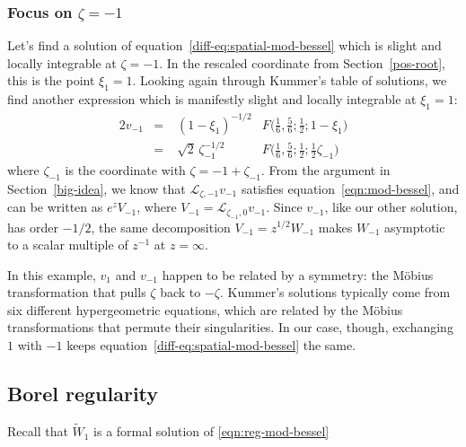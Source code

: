 \documentclass{article}
\newcommand{\laplace}{\mathcal{L}}
\begin{document}
\subsubsection{Focus on $\zeta = -1$}\label{neg-root}
Let's find a solution of equation~\eqref{diff-eq:spatial-mod-bessel} which is slight and locally integrable at $\zeta = -1$. In the rescaled coordinate from Section~\ref{pos-root}, this is the point $\xi_1 = 1$. Looking again through Kummer's table of solutions, we find another expression \cite[formula~15.10.14]{dlmf} which is manifestly slight and locally integrable at $\xi_1 = 1$:
\begin{alignat*}{2}
v_{-1} &=\;& (1-\xi_1)^{-1/2} & F\big(\tfrac{1}{6}, \tfrac{5}{6}; \tfrac{1}{2}; 1-\xi_1\big) \\
&=\;& \sqrt{2}\,\zeta_{-1}^{-1/2} & F\big(\tfrac{1}{6}, \tfrac{5}{6}; \tfrac{1}{2}; \tfrac{1}{2}\zeta_{-1}\big)
\end{alignat*}
where $\zeta_{-1}$ is the coordinate with $\zeta = -1 + \zeta_{-1}$. From the argument in Section~\ref{big-idea}, we know that $\laplace_{\zeta, -1} v_{-1}$ satisfies equation~\eqref{eqn:mod-bessel}, and can be written as $e^z V_{-1}$, where $V_{-1} = \laplace_{\zeta_{-1}, 0} v_{-1}$. Since $v_{-1}$, like our other solution, has order $-1/2$, the same decomposition $V_{-1} = z^{1/2} W_{-1}$ makes $W_{-1}$ asymptotic to a scalar multiple of $z^{-1}$ at $z = \infty$.

In this example, $v_1$ and $v_{-1}$ happen to be related by a symmetry: the M\"{o}bius transformation that pulls $\zeta$ back to $-\zeta$. Kummer's solutions typically come from six different hypergeometric equations, which are related by the M\"{o}bius transformations that permute their singularities. In our case, though, exchanging $1$ with $-1$ keeps equation~\eqref{diff-eq:spatial-mod-bessel} the same.

\subsection{Borel regularity}\label{bessel-regularity}
Recall that $\tilde{W}_1$ is a formal solution of \eqref{eqn:reg-mod-bessel}
\end{document}

